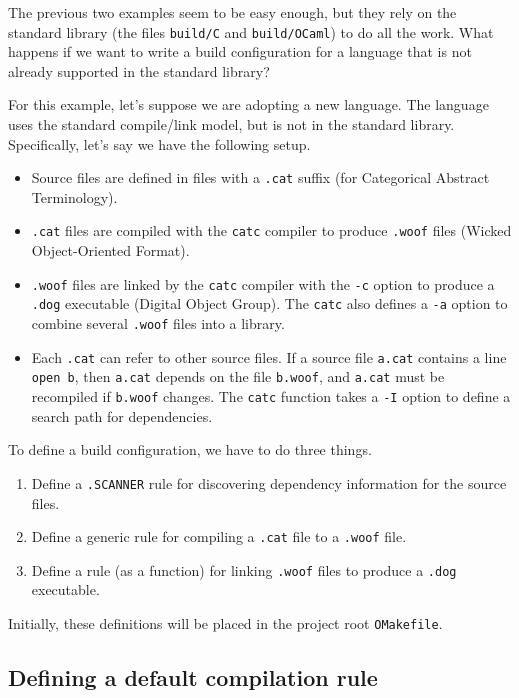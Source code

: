 The previous two examples seem to be easy enough, but they rely on the \OMake{} standard library (the
files \verb+build/C+ and \verb+build/OCaml+) to do all the work.  What happens if we want to write a
build configuration for a language that is not already supported in the \OMake{} standard library?

For this example, let's suppose we are adopting a new language.  The language uses the standard
compile/link model, but is not in the \OMake{} standard library.  Specifically, let's say we have the
following setup.

\begin{itemize}
\item Source files are defined in files with a \verb+.cat+ suffix (for Categorical Abstract Terminology).
\item \verb+.cat+ files are compiled with the \verb+catc+ compiler to produce \verb+.woof+ files
(Wicked Object-Oriented Format).
\item \verb+.woof+ files are linked by the \verb+catc+ compiler with the \verb+-c+ option to produce
a \verb+.dog+ executable (Digital Object Group).  The \verb+catc+ also defines a \verb+-a+ option to
combine several \verb+.woof+ files into a library.
\item Each \verb+.cat+ can refer to other source files.  If a source file \verb+a.cat+ contains a
line \verb+open b+, then \verb+a.cat+ depends on the file \verb+b.woof+, and \verb+a.cat+ must be
recompiled if \verb+b.woof+ changes.  The \verb+catc+ function takes a \verb+-I+ option to define a
search path for dependencies.
\end{itemize}

To define a build configuration, we have to do three things.
\begin{enumerate}
\item Define a \verb+.SCANNER+ rule for discovering dependency information for the source files.
\item Define a generic rule for compiling a \verb+.cat+ file to a \verb+.woof+ file.
\item Define a rule (as a function) for linking \verb+.woof+ files to produce a \verb+.dog+ executable.
\end{enumerate}

Initially, these definitions will be placed in the project root \verb+OMakefile+.

\subsection{Defining a default compilation rule}

